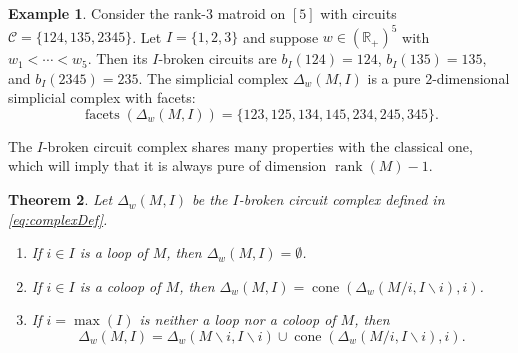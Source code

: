 \documentclass[10pt]{amsart}
\newtheorem{theo}{Theorem}[section]
\theoremstyle{definition}
\newtheorem{exam}[theo]{Example}
\newcommand{\R}{\mathbb{R}}
\newcommand{\CC}{\mathcal{C}}
\DeclareMathOperator{\rank}{rank}
\DeclareMathOperator{\cone}{cone}
\DeclareMathOperator{\facets}{facets}
\begin{document}
\begin{exam} \label{ex:NonGenMatroid} 
Consider the rank-$3$ matroid on $[5]$ with circuits $\CC = \{124, 135, 2345\}$.
Let $I = \{1,2,3\}$ and suppose $w\in (\R_+)^5$ with $w_1<\cdots < w_5$.
Then its $I$-broken circuits are 
$b_I(124) = 124$, $b_I(135) = 135$, and
$b_I(2345) = 235$.
The simplicial complex $\Delta_w(M,I)$ is a pure $2$-dimensional simplicial complex with facets:
\[ \facets(\Delta_w(M,I))  =  \{ 123, 125, 134, 145, 234, 245, 345 \}.\]
\end{exam}


The $I$-broken circuit complex shares many properties with the classical one, which will imply that 
it is always pure of dimension $\rank (M)-1$. 


\begin{theo}\label{thm:Complex}
Let $\Delta_w(M,I)$ be the $I$-broken circuit complex defined in \eqref{eq:complexDef}. 
\begin{enumerate}[(\alph*)]
\item\label{theo3.2_a} %
If $i\in I$ is a loop of $M$, then $\Delta_w(M,I) = \emptyset$. 
\item\label{theo3.2_b} %
If $i\in I$ is a coloop of $M$, then $\Delta_w(M,I)=\cone (\Delta_w(M/i,I\backslash i),i)$.
\item\label{theo3.2_c} %
If $i=\max(I)$ is neither a loop nor a coloop of $M$, then 
\[\Delta_w(M,I) = \Delta_w(M\backslash i,I \backslash i)  \cup  \cone ( \Delta_w(M/i,I\backslash i), i). \]
\end{enumerate}
\end{theo}
\end{document}
